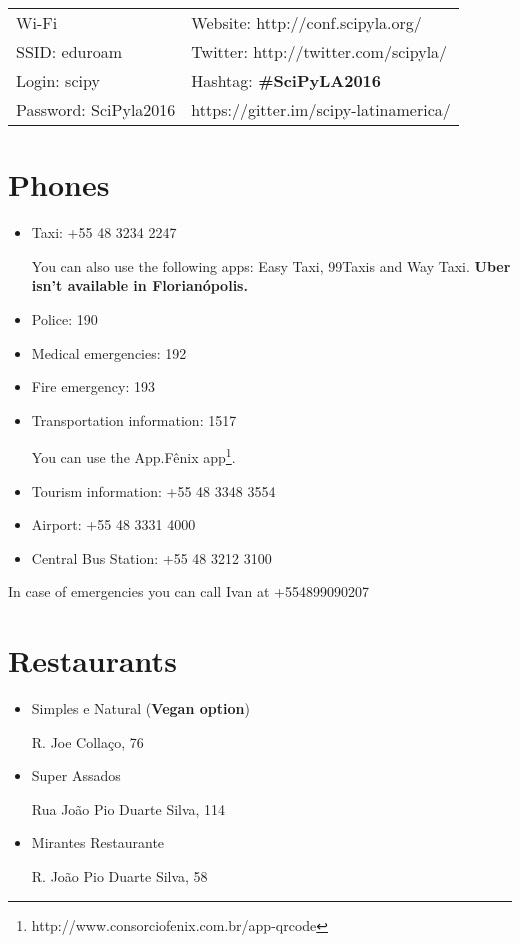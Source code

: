 \documentclass[10pt]{article}
\begin{document}
\begin{center}
  \begin{tabular}{p{3.5cm} p{7cm}}
     Wi-Fi & Website: http://conf.scipyla.org/ \\
     SSID: eduroam & Twitter: http://twitter.com/scipyla/ \\
     Login: scipy & Hashtag: \textbf{\#SciPyLA2016} \\
     Password: SciPyla2016 & https://gitter.im/scipy-latinamerica/
   \end{tabular}
\end{center}

\section*{Phones}

\begin{itemize}
    \item Taxi: +55 48 3234 2247

      You can also use the following apps: Easy Taxi, 99Taxis and Way Taxi.
      \textbf{Uber isn't available in Florianópolis.}
    \item Police: 190
    \item Medical emergencies: 192
    \item Fire emergency: 193
    \item Transportation information: 1517

      You can use the App.Fênix app\footnote{http://www.consorciofenix.com.br/app-qrcode}.
    \item Tourism information: +55 48 3348 3554
    \item Airport: +55 48 3331 4000
    \item Central Bus Station: +55 48 3212 3100
\end{itemize}

In case of emergencies you can call Ivan at +554899090207 %

\clearpage

\section*{Restaurants}

\begin{itemize}
  \item Simples e Natural (\textbf{Vegan option})

    R. Joe Collaço, 76
  \item Super Assados

    Rua João Pio Duarte Silva, 114

  \item Mirantes Restaurante

    R. João Pio Duarte Silva, 58
\end{itemize}
\end{document}
